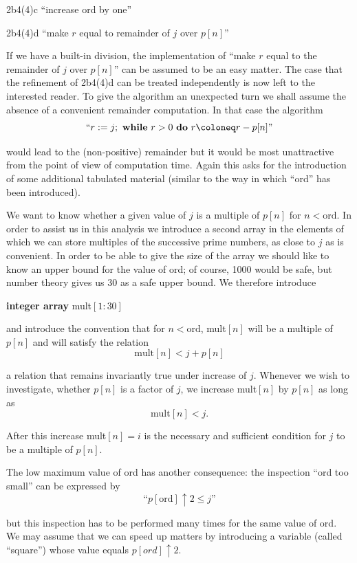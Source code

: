 \documentclass[twoside,11pt]{book}
\begin{document}
\noindent
2b4(4)c\tabto{5em} ``increase ord by one''

\noindent
2b4(4)d\tabto{5em} ``make $r$ equal to remainder of $j$ over $p[n]$''

If we have a built-in division, the implementation of ``make $r$ equal to the remainder of $j$ over $p[n]$'' can be assumed to be an easy matter. The case that the refinement of 2b4(4)d can be treated independently is now left to the interested reader. To give the algorithm an unexpected turn we shall assume the absence of a convenient remainder computation. In that case the algorithm
$$
\text{``}r: = j;\text{ \textbf{while} } r > 0\text{ \textbf{do} } r \coloneq r - p[n]\text{''}
$$

\noindent
would lead to the (non-positive) remainder but it would be most unattractive from the point of view of computation time. Again this asks for the introduction of some additional tabulated material (similar to the way in which ``ord'' has been introduced).

We want to know whether a given value of $j$ is a multiple of $p[n]$ for $n < \text{ord}$. In order to assist us in this analysis we introduce a second array in the elements of which we can store multiples of the successive prime numbers, as close to $j$ as is convenient. In order to be able to give the size of the array we should like to know an upper bound for the value of ord; of course, 1000 would be safe, but number theory gives us 30 as a safe upper bound. We therefore introduce

\noindent
\textbf{integer array} mult$[1 : 30]$

\noindent
and introduce the convention that for $n < \text{ord}$, mult$[n]$ will be a multiple of $p[n]$ and will satisfy the relation
$$
\text{mult}[n] < j + p[n]
$$

\noindent
a relation that remains invariantly true under increase of $j$. Whenever we wish to investigate, whether $p[n]$ is a factor of $j$, we increase mult$[n]$ by $p[n]$ as long as
$$
\text{mult}[n] < j.
$$

\noindent
After this increase mult$[n] = i$ is the necessary and sufficient condition for $j$ to be a multiple of $p[n]$.

The low maximum value of ord has another consequence: the inspection ``ord too small'' can be expressed by
$$
\text{``}p[\text{ord}] \uparrow 2 \leqslant j\text{''}
$$

\noindent
but this inspection has to be performed many times for the same value of ord. We may assume that we can speed up matters by introducing a variable (called ``square'') whose value equals $p[ord] \uparrow 2$.
\end{document}
